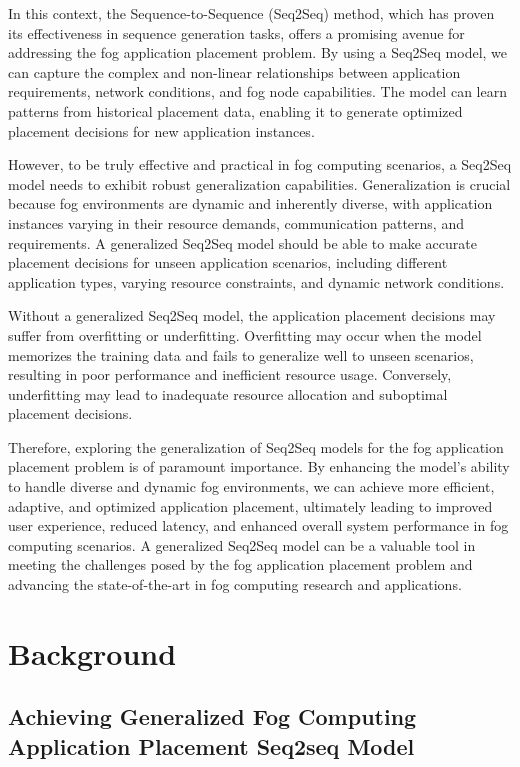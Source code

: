\documentclass[conference]{IEEEtran}
\begin{document}
In this context, the Sequence-to-Sequence (Seq2Seq) method, which has proven its effectiveness in sequence generation tasks, offers a promising avenue for addressing the fog application placement problem. By using a Seq2Seq model, we can capture the complex and non-linear relationships between application requirements, network conditions, and fog node capabilities. The model can learn patterns from historical placement data, enabling it to generate optimized placement decisions for new application instances.

However, to be truly effective and practical in fog computing scenarios, a Seq2Seq model needs to exhibit robust generalization capabilities. Generalization is crucial because fog environments are dynamic and inherently diverse, with application instances varying in their resource demands, communication patterns, and requirements. A generalized Seq2Seq model should be able to make accurate placement decisions for unseen application scenarios, including different application types, varying resource constraints, and dynamic network conditions.

Without a generalized Seq2Seq model, the application placement decisions may suffer from overfitting or underfitting. Overfitting may occur when the model memorizes the training data and fails to generalize well to unseen scenarios, resulting in poor performance and inefficient resource usage. Conversely, underfitting may lead to inadequate resource allocation and suboptimal placement decisions.

Therefore, exploring the generalization of Seq2Seq models for the fog application placement problem is of paramount importance. By enhancing the model's ability to handle diverse and dynamic fog environments, we can achieve more efficient, adaptive, and optimized application placement, ultimately leading to improved user experience, reduced latency, and enhanced overall system performance in fog computing scenarios. A generalized Seq2Seq model can be a valuable tool in meeting the challenges posed by the fog application placement problem and advancing the state-of-the-art in fog computing research and applications.

\section{Background}

\subsection{Achieving Generalized Fog Computing Application Placement Seq2seq Model}
\end{document}
